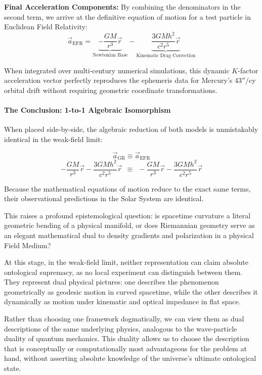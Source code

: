 \documentclass[twocolumn]{article}
\begin{document}
\textbf{Final Acceleration Components:} By combining the denominators in
the second term, we arrive at the definitive equation of motion for a
test particle in Euclidean Field Relativity:
\[\vec{a}_{\text{EFR}} = \underbrace{-\frac{GM}{r^3}\vec{r}}_{\text{Newtonian Base}} - \underbrace{\frac{3GMh^2}{c^2 r^5}\vec{r}}_{\text{Kinematic Drag Correction}}\]

When integrated over multi-century numerical simulations, this dynamic
\(K\)-factor acceleration vector perfectly reproduces the ephemeris data
for Mercury's \(43''\)/cy orbital drift without requiring geometric
coordinate transformations.

\paragraph{The Conclusion: 1-to-1 Algebraic
Isomorphism}\label{the-conclusion-1-to-1-algebraic-isomorphism}

When placed side-by-side, the algebraic reduction of both models is
unmistakably identical in the weak-field limit:

\[ \vec{a}_{\text{GR}} \equiv \vec{a}_{\text{EFR}} \]
\[ -\frac{GM}{r^3}\vec{r} - \frac{3GMh^2}{c^2 r^5}\vec{r} \ \ \equiv \ \ -\frac{GM}{r^3}\vec{r} - \frac{3GMh^2}{c^2 r^5}\vec{r} \]

Because the mathematical equations of motion reduce to the exact same
terms, their observational predictions in the Solar System are
identical.

This raises a profound epistemological question: is spacetime curvature
a literal geometric bending of a physical manifold, or does Riemannian
geometry serve as an elegant mathematical dual to density gradients and
polarization in a physical Field Medium?

At this stage, in the weak-field limit, neither representation can claim
absolute ontological supremacy, as no local experiment can distinguish
between them. They represent dual physical pictures: one describes the
phenomenon geometrically as geodesic motion in curved spacetime, while
the other describes it dynamically as motion under kinematic and optical
impedance in flat space.

Rather than choosing one framework dogmatically, we can view them as
dual descriptions of the same underlying physics, analogous to the
wave-particle duality of quantum mechanics. This duality allows us to
choose the description that is conceptually or computationally most
advantageous for the problem at hand, without asserting absolute
knowledge of the universe's ultimate ontological state.
\end{document}
